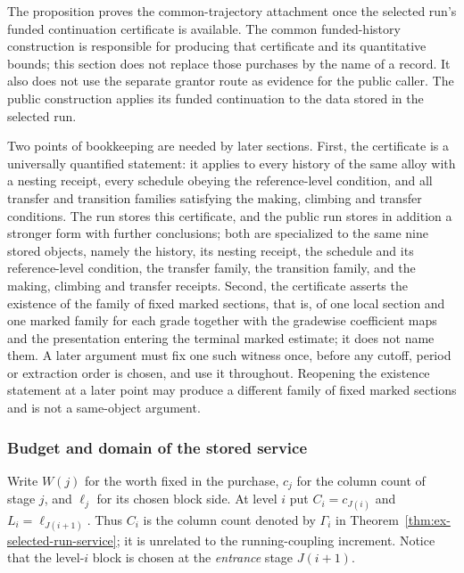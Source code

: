 \begin{remark}
The proposition proves the common-trajectory attachment once the selected run's
funded continuation certificate is available. The common funded-history
construction is responsible for producing that certificate and its
quantitative bounds; this section does not replace those purchases by the
name of a record. It also does not use the separate grantor route as
evidence for the public caller. The public construction applies its funded
continuation to the data stored in the selected run.

Two points of bookkeeping are needed by later sections. First, the
certificate is a universally quantified statement: it applies to every
history of the same alloy with a nesting receipt, every schedule obeying
the reference-level condition, and all transfer and transition families
satisfying the making, climbing and transfer conditions. The run stores
this certificate, and the public run stores in addition a stronger form
with further conclusions; both are specialized to the same nine stored
objects, namely the history, its nesting receipt, the schedule and its
reference-level condition, the transfer family, the transition family,
and the making, climbing and transfer receipts. Second, the certificate
asserts the existence of the family of fixed marked sections, that is, of one local
section and one marked family for each grade together with the
gradewise coefficient maps and the presentation entering the terminal
marked estimate; it does not name them. A later argument must fix one
such witness once, before any cutoff, period or extraction order is
chosen, and use it throughout. Reopening the existence statement at a
later point may produce a different family of fixed marked sections and is not a same-object
argument.
\end{remark}

\subsubsection{Budget and domain of the stored service}
\label{sec:ex-stored-service-budget}

Write $W(j)$ for the worth fixed in the purchase, $c_j$ for the
column count of stage $j$, and $\ell_j$ for its chosen block side.
At level $i$ put $C_i=c_{J(i)}$ and $L_i=\ell_{J(i+1)}$.
Thus $C_i$ is the column count denoted by $\Gamma_i$ in
Theorem~\ref{thm:ex-selected-run-service}; it is unrelated to the
running-coupling increment. Notice that the level-$i$ block is
chosen at the \emph{entrance} stage $J(i+1)$.

